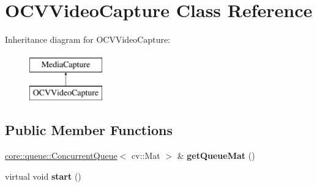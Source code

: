\hypertarget{class_o_c_v_video_capture}{}\section{O\+C\+V\+Video\+Capture Class Reference}
\label{class_o_c_v_video_capture}
Inheritance diagram for O\+C\+V\+Video\+Capture\+:\begin{figure}[H]
\begin{center}
\leavevmode
\includegraphics[height=2.000000cm]{d4/dea/class_o_c_v_video_capture}
\end{center}
\end{figure}
\subsection*{Public Member Functions}
\begin{DoxyCompactItemize}
\item 
\mbox{\label{class_o_c_v_video_capture_ad0ce85a17fd0e5ec321a2f7f88e69aa4}} 
\hyperlink{classcore_1_1queue_1_1_concurrent_queue}{core\+::queue\+::\+Concurrent\+Queue}$<$ cv\+::\+Mat $>$ \& {\bfseries get\+Queue\+Mat} ()
\item 
\mbox{\label{class_o_c_v_video_capture_abb390504e1b476be737b4a9357e8f181}} 
virtual void {\bfseries start} ()
\end{DoxyCompactItemize}
